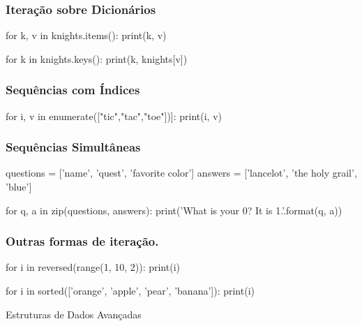 \begin{frame}[fragile]
    \frametitle{Iteração sobre Dicionários}
    \begin{python}
        for k, v in knights.items():
             print(k, v)

        for k in knights.keys():
             print(k, knights[v])
    \end{python}
\end{frame}

\begin{frame}[fragile]
    \frametitle{Sequências com Índices}
    \begin{python}
        for i, v in enumerate(["tic","tac","toe"])]:
             print(i, v)
    \end{python}
\end{frame}

\begin{frame}[fragile]
    \frametitle{Sequências Simultâneas}
    \begin{python}
         questions = ['name', 'quest', 'favorite color']
         answers = ['lancelot', 'the holy grail', 'blue']

         for q, a in zip(questions, answers):
              print('What is your {0}?  It is {1}.'.format(q, a))
    \end{python}
\end{frame}

\begin{frame}[fragile]
    \frametitle{Outras formas de iteração.}
    \begin{python}
        for i in reversed(range(1, 10, 2)):
            print(i)

        for i in sorted(['orange', 'apple', 'pear', 'banana']):
            print(i)
    \end{python}
\end{frame}

\begin{frame}
    \begin{center}
        \Huge Estruturas de Dados Avançadas
    \end{center}
\end{frame}

